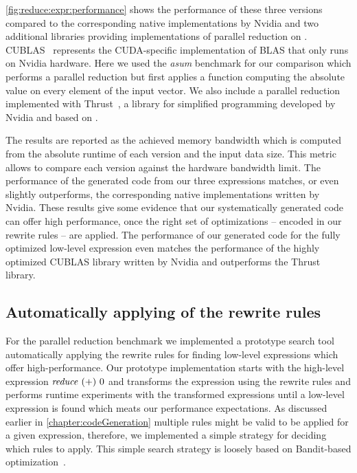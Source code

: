 \autoref{fig:reduce:expr:performance} shows the performance of these three versions compared to the corresponding native \OpenCL implementations by Nvidia and two additional libraries providing implementations of parallel reduction on \GPUs.
CUBLAS~\cite{cuBLAS} represents the CUDA-specific implementation of BLAS that only runs on Nvidia hardware.
Here we used the \emph{asum} benchmark for our comparison which performs a parallel reduction but first applies a function computing the absolute value on every element of the input vector.
We also include a parallel reduction implemented with Thrust~\cite{BellHo2011}, a library for simplified \GPU programming developed by Nvidia and based on \CUDA.

The results are reported as the achieved memory bandwidth which is computed from the absolute runtime of each version and the input data size.
This metric allows to compare each version against the hardware bandwidth limit.
The performance of the generated \OpenCL code from our three expressions matches, or even slightly outperforms, the corresponding native \OpenCL implementations written by Nvidia.
These results give some evidence that our systematically generated code can offer high performance, once the right set of optimizations -- encoded in our rewrite rules -- are applied.
The performance of our generated code for the fully optimized low-level expression even matches the performance of the highly optimized CUBLAS library written by Nvidia and outperforms the Thrust library.





\subsection{Automatically applying of the rewrite rules}

For the parallel reduction benchmark we implemented a prototype search tool automatically applying the rewrite rules for finding low-level expressions which offer high-performance.
Our prototype implementation starts with the high-level expression $\text{\textit{reduce}}\ (+)\ 0$ and transforms the expression using the rewrite rules and performs runtime experiments with the transformed expressions until a low-level \OpenCL expression is found which meats our performance expectations.
As discussed earlier in \autoref{chapter:codeGeneration} multiple rules might be valid to be applied for a given expression, therefore, we implemented a simple strategy for deciding which rules to apply.
This simple search strategy is loosely based on Bandit-based optimization~\cite{}.

